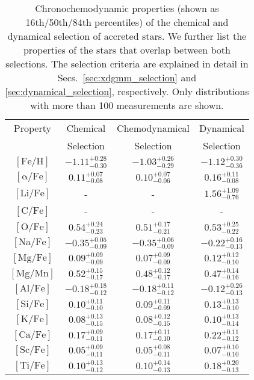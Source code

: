 \begingroup
\renewcommand{\arraystretch}{1.19}
\begin{table}
\centering
\caption{Chronochemodynamic properties (shown as 16th/50th/84th percentiles) of the chemical and dynamical selection of accreted stars. We further list the properties of the stars that overlap between both selections. The selection criteria are explained in detail in Secs.~\ref{sec:xdgmm_selection} and \ref{sec:dynamical_selection}, respectively. Only distributions with more than 100 measurements are shown.}
\label{tab:chronochemodynamic_properties}
\begin{tabular}{cccc}
\hline
Property & Chemical & Chemodynamical & Dynamical \\
& Selection & Selection & Selection \\
\hline \hline
$\mathrm{[Fe/H]}$ & $-1.11_{-0.30}^{+0.28}$ & $-1.03_{-0.29}^{+0.26}$ & $-1.12_{-0.36}^{+0.30}$ \\
$\mathrm{[\alpha/Fe]}$ & $0.11_{-0.08}^{+0.07}$ & $0.10_{-0.06}^{+0.07}$ & $0.16_{-0.08}^{+0.11}$ \\
$\mathrm{[Li/Fe]}$ & - & - & $1.56_{-0.76}^{+1.09}$ \\
$\mathrm{[C/Fe]}$ & - & - & - \\
$\mathrm{[O/Fe]}$ & $0.54_{-0.23}^{+0.24}$ & $0.51_{-0.21}^{+0.17}$ & $0.53_{-0.22}^{+0.25}$ \\
$\mathrm{[Na/Fe]}$ & $-0.35_{-0.09}^{+0.05}$ & $-0.35_{-0.09}^{+0.06}$ & $-0.22_{-0.13}^{+0.16}$ \\
$\mathrm{[Mg/Fe]}$ & $0.09_{-0.09}^{+0.09}$ & $0.07_{-0.09}^{+0.09}$ & $0.12_{-0.10}^{+0.12}$ \\
$\mathrm{[Mg/Mn]}$ & $0.52_{-0.17}^{+0.15}$ & $0.48_{-0.17}^{+0.12}$ & $0.47_{-0.16}^{+0.14}$ \\
$\mathrm{[Al/Fe]}$ & $-0.18_{-0.12}^{+0.18}$ & $-0.18_{-0.12}^{+0.11}$ & $-0.12_{-0.13}^{+0.26}$ \\
$\mathrm{[Si/Fe]}$ & $0.10_{-0.10}^{+0.11}$ & $0.09_{-0.09}^{+0.11}$ & $0.13_{-0.10}^{+0.13}$ \\
$\mathrm{[K/Fe]}$ & $0.08_{-0.15}^{+0.13}$ & $0.08_{-0.15}^{+0.12}$ & $0.10_{-0.14}^{+0.13}$ \\
$\mathrm{[Ca/Fe]}$ & $0.17_{-0.11}^{+0.09}$ & $0.17_{-0.10}^{+0.11}$ & $0.22_{-0.12}^{+0.11}$ \\
$\mathrm{[Sc/Fe]}$ & $0.05_{-0.11}^{+0.09}$ & $0.05_{-0.11}^{+0.08}$ & $0.07_{-0.10}^{+0.10}$ \\
$\mathrm{[Ti/Fe]}$ & $0.10_{-0.12}^{+0.13}$ & $0.10_{-0.13}^{+0.14}$ & $0.18_{-0.13}^{+0.20}$ \\

\end{tabular}
\end{table}

